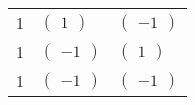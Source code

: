 \begin{questions}
\begin{solution}
\begin{center}
\begin{tabular}{cll}
        1         & $\begin{pmatrix} 1 \end{pmatrix}$  & $\begin{pmatrix} -1 \end{pmatrix}$ \\
        1         & $\begin{pmatrix} -1 \end{pmatrix}$ & $\begin{pmatrix} 1 \end{pmatrix}$  \\
        1         & $\begin{pmatrix} -1 \end{pmatrix}$ & $\begin{pmatrix} -1 \end{pmatrix}$ \\
        \bottomrule
      \end{tabular}
    \end{center}
  \end{solution}
\end{questions}


